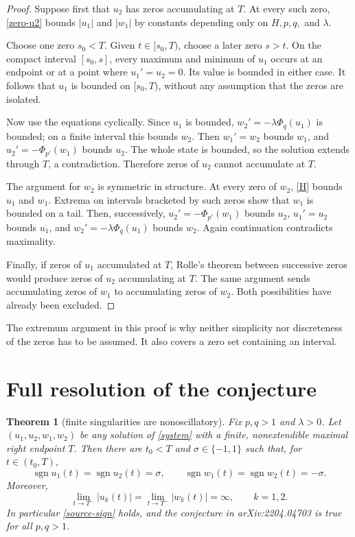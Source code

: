\documentclass[11pt]{article}
\newtheorem{theorem}{Theorem}
\newcommand{\sgn}{\operatorname{sgn}}
\begin{document}
\begin{proof}
Suppose first that $u_2$ has zeros accumulating at $T$.  At every such zero,
\eqref{zero-u2} bounds $|u_1|$ and $|w_1|$ by constants depending only on
$H,p,q,$ and $\lambda$.

Choose one zero $s_0<T$.  Given $t\in[s_0,T)$, choose a later zero $s>t$.
On the compact interval $[s_0,s]$, every maximum and minimum of $u_1$ occurs
at an endpoint or at a point where $u_1'=u_2=0$.  Its value is bounded in
either case.  It follows that $u_1$ is bounded on $[s_0,T)$, without any
assumption that the zeros are isolated.

Now use the equations cyclically.  Since $u_1$ is bounded,
$w_2'=-\lambda\Phi_q(u_1)$ is bounded; on a finite interval this bounds
$w_2$.  Then $w_1'=w_2$ bounds $w_1$, and
$u_2'=-\Phi_{p'}(w_1)$ bounds $u_2$.  The whole state is bounded, so the
solution extends through $T$, a contradiction.  Therefore zeros of $u_2$
cannot accumulate at $T$.

The argument for $w_2$ is symmetric in structure.  At every zero of $w_2$,
\eqref{H} bounds $u_1$ and $w_1$.  Extrema on intervals bracketed by such
zeros show that $w_1$ is bounded on a tail.  Then, successively,
$u_2'=-\Phi_{p'}(w_1)$ bounds $u_2$, $u_1'=u_2$ bounds $u_1$, and
$w_2'=-\lambda\Phi_q(u_1)$ bounds $w_2$.  Again continuation contradicts
maximality.

Finally, if zeros of $u_1$ accumulated at $T$, Rolle's theorem between
successive zeros would produce zeros of $u_2$ accumulating at $T$.  The same
argument sends accumulating zeros of $w_1$ to accumulating zeros of $w_2$.
Both possibilities have already been excluded.
\end{proof}

The extremum argument in this proof is why neither simplicity nor discreteness
of the zeros has to be assumed.  It also covers a zero set containing an
interval.

\section{Full resolution of the conjecture}

\begin{theorem}[finite singularities are nonoscillatory]\label{main}
Fix $p,q>1$ and $\lambda>0$.  Let
$(u_1,u_2,w_1,w_2)$ be any solution of \eqref{system} with a finite,
nonextendible maximal right endpoint $T$.  Then there are $t_0<T$ and
$\sigma\in\{-1,1\}$ such that, for $t\in(t_0,T)$,
\[
 \sgn u_1(t)=\sgn u_2(t)=\sigma,
 \qquad
 \sgn w_1(t)=\sgn w_2(t)=-\sigma.
\]
Moreover,
\[
 \lim_{t\to T^-}|u_k(t)|
 =\lim_{t\to T^-}|w_k(t)|=\infty,
 \qquad k=1,2.
\]
In particular \eqref{source-sign} holds, and the conjecture in
arXiv:2204.04703 is true for all $p,q>1$.
\end{theorem}
\end{document}
